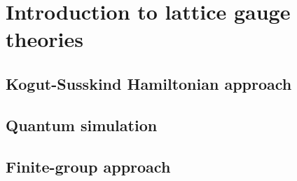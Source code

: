 \chapter{Introduction to lattice gauge theories}
\label{chap:introduction_to_lattice_gauge_theories}





\section{Kogut-Susskind Hamiltonian approach}
\label{sec:kogut_susskind_approach}


\section{Quantum simulation}
\label{sec:quantum_simulation}


\section{Finite-group approach}
\label{sec:finite_group_approach}
